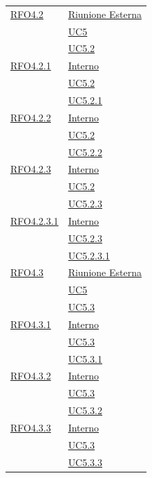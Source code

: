 \begin{itemize}
\begin{itemize}
\begin{itemize}
\begin{itemize}
\begin{longtable}{|>{\centering}m{5cm}|m{5cm}<{\centering}|}
\hyperlink{RFO4.2}{RFO4.2} & \hyperlink{Riunione Esterna}{Riunione Esterna}\\
& \hyperref[UC5]{UC5}\\
& \hyperref[UC5.2]{UC5.2}\\ \hline

\hyperlink{RFO4.2.1}{RFO4.2.1} & \hyperlink{Interno}{Interno}\\
& \hyperref[UC5.2]{UC5.2}\\
& \hyperref[UC5.2.1]{UC5.2.1}\\ \hline

\hyperlink{RFO4.2.2}{RFO4.2.2} & \hyperlink{Interno}{Interno}\\
& \hyperref[UC5.2]{UC5.2}\\
& \hyperref[UC5.2.2]{UC5.2.2}\\ \hline

\hyperlink{RFO4.2.3}{RFO4.2.3} & \hyperlink{Interno}{Interno}\\
& \hyperref[UC5.2]{UC5.2}\\
& \hyperref[UC5.2.3]{UC5.2.3}\\ \hline

\hyperlink{RFO4.2.3.1}{RFO4.2.3.1} & \hyperlink{Interno}{Interno}\\
& \hyperref[UC5.2.3]{UC5.2.3}\\
& \hyperref[UC5.2.3.1]{UC5.2.3.1}\\ \hline

\hyperlink{RFO4.3}{RFO4.3} & \hyperlink{Riunione Esterna}{Riunione Esterna}\\
& \hyperref[UC5]{UC5}\\
& \hyperref[UC5.3]{UC5.3}\\ \hline

\hyperlink{RFO4.3.1}{RFO4.3.1} & \hyperlink{Interno}{Interno}\\
& \hyperref[UC5.3]{UC5.3}\\
& \hyperref[UC5.3.1]{UC5.3.1}\\ \hline

\hyperlink{RFO4.3.2}{RFO4.3.2} & \hyperlink{Interno}{Interno}\\
& \hyperref[UC5.3]{UC5.3}\\
& \hyperref[UC5.3.2]{UC5.3.2}\\ \hline

\hyperlink{RFO4.3.3}{RFO4.3.3} & \hyperlink{Interno}{Interno}\\
& \hyperref[UC5.3]{UC5.3}\\
& \hyperref[UC5.3.3]{UC5.3.3}\\ \hline


\end{longtable}
\end{itemize}
\end{itemize}
\end{itemize}
\end{itemize}
